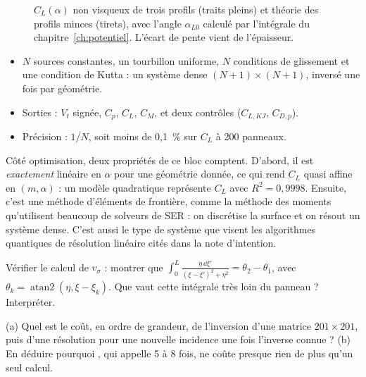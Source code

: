 \begin{figure}[htbp]
\centering

\caption{$C_L(\alpha)$ non visqueux de trois profils (traits pleins) et théorie des profils minces (tirets), avec l'angle $\alpha_{L0}$ calculé par l'intégrale du chapitre~\ref{ch:potentiel}. L'écart de pente vient de l'épaisseur.}\label{fig:cl-alpha}
\end{figure}

\begin{resultat}
\begin{itemize}
\item $N$ sources constantes, un tourbillon uniforme, $N$ conditions de glissement et une condition de Kutta : un système dense $(N+1)\times(N+1)$, inversé une fois par géométrie.
\item Sorties : $V_t$ signée, $C_p$, $C_L$, $C_M$, et deux contrôles ($C_{L,KJ}$, $C_{D,p}$).
\item Précision : $1/N$, soit moins de 0,1~\% sur $C_L$ à 200 panneaux.
\end{itemize}
\end{resultat}

\begin{projet}
Côté optimisation, deux propriétés de ce bloc comptent. D'abord, il est \emph{exactement} linéaire en $\alpha$ pour une géométrie donnée, ce qui rend $C_L$ quasi affine en $(m,\alpha)$ : un modèle quadratique représente $C_L$ avec $R^2=0{,}9998$. Ensuite, c'est une méthode d'éléments de frontière, comme la méthode des moments qu'utilisent beaucoup de solveurs de SER : on discrétise la surface et on résout un système dense. C'est aussi le type de système que visent les algorithmes quantiques de résolution linéaire cités dans la note d'intention.
\end{projet}

\exercices
\begin{exercice}
Vérifier le calcul de $v_\sigma$ : montrer que $\int_0^L\frac{\eta\,\dd\xi'}{(\xi-\xi')^2+\eta^2}=\theta_2-\theta_1$, avec $\theta_k=\operatorname{atan2}(\eta,\xi-\xi_k)$. Que vaut cette intégrale très loin du panneau ? Interpréter.
\end{exercice}
\begin{exercice}
(a) Quel est le coût, en ordre de grandeur, de l'inversion d'une matrice $201\times201$, puis d'une résolution pour une nouvelle incidence une fois l'inverse connue ? (b) En déduire pourquoi , qui appelle  5 à 8 fois, ne coûte presque rien de plus qu'un seul calcul.
\end{exercice}
